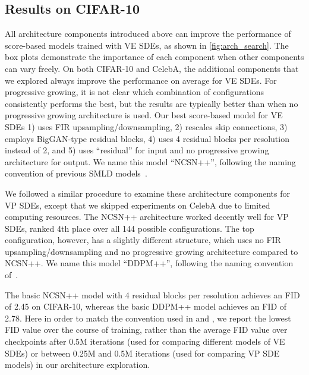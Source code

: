 \subsection{Results on CIFAR-10}\label{app:rescifar10} 

All architecture components introduced above can improve the performance of score-based models trained with VE SDEs, as shown in \cref{fig:arch_search}. The box plots demonstrate the importance of each component when other components can vary freely. On both CIFAR-10 and CelebA, the additional components that we explored always improve the performance on average for VE SDEs. For progressive growing, it is not clear which combination of configurations consistently performs the best, but the results are typically better than when no progressive growing architecture is used. Our best score-based model for VE SDEs 1) uses FIR upsampling/downsampling, 2) rescales skip connections, 3) employs BigGAN-type residual blocks, 4) uses 4 residual blocks per resolution instead of 2, and 5) uses ``residual'' for input and no progressive growing architecture for output. We name this model ``NCSN++'', following the naming convention of previous SMLD models~\citep{song2019generative,song2020improved}. 

We followed a similar procedure to examine these architecture components for VP SDEs, except that we skipped experiments on CelebA due to limited computing resources. %
The NCSN++ architecture worked decently well for VP SDEs, ranked 4th place over all 144 possible configurations. The top configuration, however, has a slightly different structure, which uses no FIR upsampling/downsampling and no progressive growing architecture compared to NCSN++. We name this model ``DDPM++'', following the naming convention of~\citet{ho2020denoising}.


The basic NCSN++ model with 4 residual blocks per resolution achieves an FID of 2.45 on CIFAR-10, whereas the basic DDPM++ model achieves an FID of 2.78. Here in order to match the convention used in \citet{karras2018progressive,song2019generative} and \citet{ho2020denoising}, we report the lowest FID value over the course of training, rather than the average FID value over checkpoints after 0.5M iterations (used for comparing different models of VE SDEs) or between 0.25M and 0.5M iterations (used for comparing VP SDE models) in our architecture exploration. %


